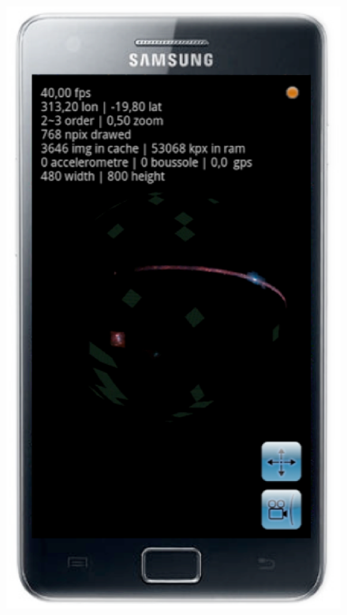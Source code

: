 \documentclass[11pt,twoside]{article}
\begin{document}
\begin{figure}[h] \center
\includegraphics[scale=0.28]{O28_f1.eps}

\end{figure}
\end{document}
